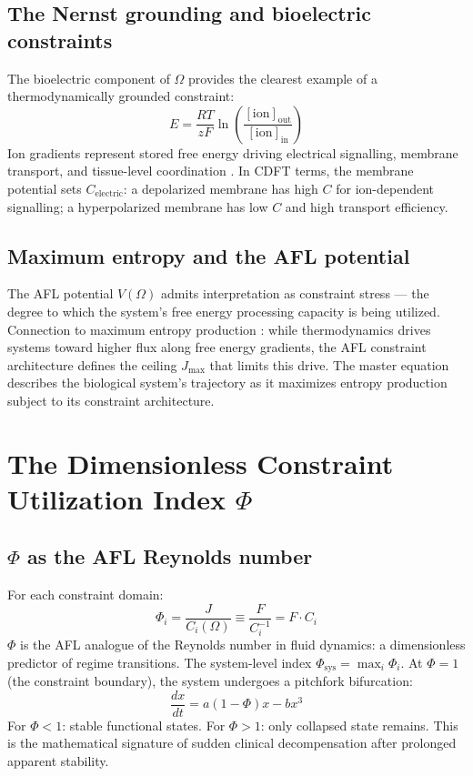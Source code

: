 \documentclass[11pt]{article}
\newcommand{\Jmax}{J_{\max}}
\newcommand{\Om}{\Omega}
\begin{document}
\subsection{The Nernst grounding and bioelectric constraints}

The bioelectric component of $\Om$ provides the clearest example of a thermodynamically grounded constraint:
\begin{equation}
E = \frac{RT}{zF} \ln\!\left(\frac{[\mathrm{ion}]_{\mathrm{out}}}{[\mathrm{ion}]_{\mathrm{in}}}\right)
\label{eq:nernst}
\end{equation}
Ion gradients represent stored free energy driving electrical signalling, membrane transport, and tissue-level coordination \citep{Levin2021,Levin2012}. In CDFT terms, the membrane potential sets $C_{\mathrm{electric}}$: a depolarized membrane has high $C$ for ion-dependent signalling; a hyperpolarized membrane has low $C$ and high transport efficiency.

\subsection{Maximum entropy and the AFL potential}

The AFL potential $V(\Om)$ admits interpretation as constraint stress --- the degree to which the system's free energy processing capacity is being utilized. Connection to maximum entropy production \citep{martyushev2006}: while thermodynamics drives systems toward higher flux along free energy gradients, the AFL constraint architecture defines the ceiling $\Jmax$ that limits this drive. The master equation describes the biological system's trajectory as it maximizes entropy production subject to its constraint architecture.


\section{The Dimensionless Constraint Utilization Index $\Phi$}
\subsection{$\Phi$ as the AFL Reynolds number}

For each constraint domain:
\begin{equation}
\Phi_i = \frac{J}{C_i(\Om)} \equiv \frac{F}{C_i^{-1}} = F \cdot C_i
\label{eq:phi}
\end{equation}
$\Phi$ is the AFL analogue of the Reynolds number in fluid dynamics: a dimensionless predictor of regime transitions. The system-level index $\Phi_{\mathrm{sys}} = \max_i \Phi_i$. At $\Phi = 1$ (the constraint boundary), the system undergoes a pitchfork bifurcation:
\begin{equation}
\frac{dx}{dt} = a(1 - \Phi)x - bx^3
\label{eq:bifurcation}
\end{equation}
For $\Phi < 1$: stable functional states. For $\Phi > 1$: only collapsed state remains. This is the mathematical signature of sudden clinical decompensation after prolonged apparent stability.
\end{document}
